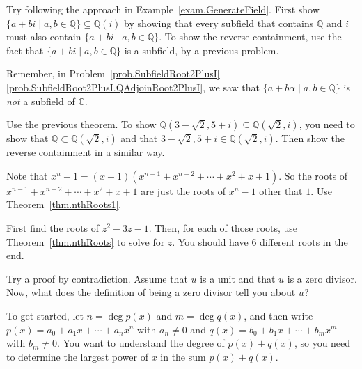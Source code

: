 \begin{hint*}
Try following the approach in Example~\ref{exam.GenerateField}. First show  $\{a+bi\mid a,b\in \mathbb{Q}\} \subseteq \mathbb{Q}(i)$ by showing that every subfield that contains $\mathbb{Q}$ and $i$ must also contain $\{a+bi\mid a,b\in \mathbb{Q}\}$. To show the reverse containment, use the fact that $\{a+bi\mid a,b\in \mathbb{Q}\}$ is a subfield, by a previous problem.
\end{hint*}

\begin{hint*}
Remember, in Problem~\ref{prob.SubfieldRoot2PlusI}\ref{prob.SubfieldRoot2PlusI.QAdjoinRoot2PlusI}, we saw that $\{a+b\alpha\mid a,b\in \mathbb{Q}\}$ is \emph{not} a subfield of $\mathbb{C}$.
\end{hint*}

\begin{hint*}
Use the previous theorem. To show  $\mathbb{Q}\left(3-\sqrt{2},5+i\right) \subseteq \mathbb{Q}\left(\sqrt{2},i\right)$, you need to show that $\mathbb{Q}\subset \mathbb{Q}\left(\sqrt{2},i\right)$ and that $3-\sqrt{2},5+i\in \mathbb{Q}\left(\sqrt{2},i\right)$. Then show the reverse containment in a similar way.
\end{hint*}

\begin{hint*}
Note that $x^n - 1 = (x-1)(x^{n-1} + x^{n-2} + \cdots + x^2 + x + 1)$. So the roots of $x^{n-1} + x^{n-2} + \cdots + x^2 + x + 1$ are just the roots of $x^n - 1$ other that $1$. Use Theorem~\ref{thm.nthRoots1}.
\end{hint*}

\begin{hint*}
First find the roots of $z^2 - 3z - 1$. Then, for each of those roots, use Theorem~\ref{thm.nthRoots} to solve for $z$. You should have 6 different roots in the end.
\end{hint*}

\begin{hint*}
Try a proof by contradiction. Assume that $u$ is a unit and that $u$ is a zero divisor. Now, what does the definition of being a zero divisor tell you about $u$?
\end{hint*}

\begin{hint*}
To get started, let $n = \deg p(x)$ and $m = \deg q(x)$, and then write $p(x) = a_0 + a_1x + \cdots + a_nx^n$ with $a_n\neq 0$ and $q(x) = b_0 + b_1x + \cdots + b_mx^m$ with $b_m\neq 0$. You want to understand the degree of $p(x) + q(x)$, so you need to determine the largest power of $x$ in the sum $p(x) + q(x)$.
\end{hint*}


